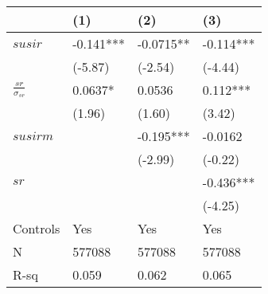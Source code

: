 \begin{tabular}{llll}
\hline
\hline
        & (1)     & (2)     & (3) \bigstrut\\
\hline
$susir$ & -0.141*** & -0.0715** & -0.114*** \bigstrut[t]\\
        & (-5.87) & (-2.54) & (-4.44) \\
$\frac{sr}{\sigma_{sr}}$ & 0.0637* & 0.0536  & 0.112*** \\
        & (1.96)  & (1.60)  & (3.42) \\
$susirm$ &         & -0.195*** & -0.0162 \\
        &         & (-2.99) & (-0.22) \\
$sr$    &         &         & -0.436*** \\
        &         &         & (-4.25) \bigstrut[b]\\
\hline
Controls & Yes     & Yes     & Yes \bigstrut[t]\\
N       & 577088  & 577088  & 577088 \\
R-sq    & 0.059   & 0.062   & 0.065 \bigstrut[b]\\
\hline
\hline
\end{tabular}%
